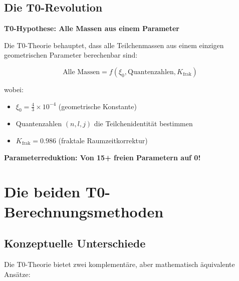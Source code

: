 \documentclass[12pt,a4paper]{article}
\begin{document}
	\subsection{Die T0-Revolution}
	
	\begin{keyresult}
		\textbf{T0-Hypothese: Alle Massen aus einem Parameter}
		
		Die T0-Theorie behauptet, dass alle Teilchenmassen aus einem einzigen geometrischen Parameter berechenbar sind:
		
		\begin{equation}
			\boxed{\text{Alle Massen} = f(\xi_0, \text{Quantenzahlen}, K_{\text{frak}})}
		\end{equation}
		
		wobei:
		\begin{itemize}
			\item $\xi_0 = \frac{4}{3} \times 10^{-4}$ (geometrische Konstante)
			\item Quantenzahlen $(n,l,j)$ die Teilchenidentität bestimmen
			\item $K_{\text{frak}} = 0.986$ (fraktale Raumzeitkorrektur)
		\end{itemize}
		
		\textbf{Parameterreduktion: Von 15+ freien Parametern auf 0!}
	\end{keyresult}
	
	\section{Die beiden T0-Berechnungsmethoden}
	
	\subsection{Konzeptuelle Unterschiede}
	
	Die T0-Theorie bietet zwei komplementäre, aber mathematisch äquivalente Ansätze:
	
\end{document}
